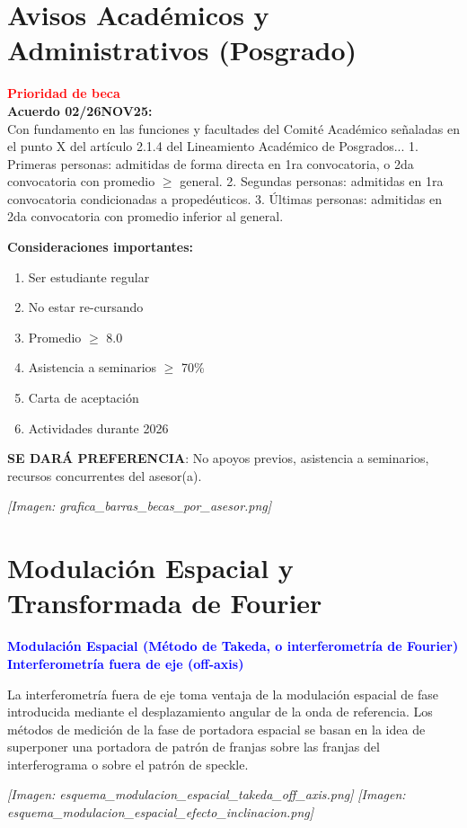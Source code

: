 \documentclass[12pt]{article}
\begin{document}
	\section{Avisos Académicos y Administrativos (Posgrado)}
	\colorbox{gray!20}{\parbox{\textwidth}{
			\textcolor{red}{\textbf{Prioridad de beca}} \\
			\textbf{Acuerdo 02/26NOV25:} \\
			Con fundamento en las funciones y facultades del Comité Académico señaladas en el punto X del artículo 2.1.4 del Lineamiento Académico de Posgrados...
			1. Primeras personas: admitidas de forma directa en 1ra convocatoria, o 2da convocatoria con promedio $\ge$ general.
			2. Segundas personas: admitidas en 1ra convocatoria condicionadas a propedéuticos.
			3. Últimas personas: admitidas en 2da convocatoria con promedio inferior al general.
	}}
	
	\begin{minipage}{0.4\textwidth}
		\textbf{Consideraciones importantes:}
		\begin{enumerate}
			\item Ser estudiante regular
			\item No estar re-cursando
			\item Promedio $\ge$ 8.0
			\item Asistencia a seminarios $\ge$ 70\%
			\item Carta de aceptación
			\item Actividades durante 2026
		\end{enumerate}
	\end{minipage}
	\hfill
	\begin{minipage}{0.55\textwidth}
		\colorbox{green!40}{\textbf{SE DARÁ PREFERENCIA}}: No apoyos previos, asistencia a seminarios, recursos concurrentes del asesor(a).
	\end{minipage}
	\textit{[Imagen: grafica\_barras\_becas\_por\_asesor.png]}
	
	\section{Modulación Espacial y Transformada de Fourier}
	\colorbox{gray!10}{\parbox{\textwidth}{
			\textcolor{blue}{\textbf{Modulación Espacial (Método de Takeda, o interferometría de Fourier) Interferometría fuera de eje (off-axis)}}
			
			La interferometría fuera de eje toma ventaja de la modulación espacial de fase introducida mediante el desplazamiento angular de la onda de referencia. Los métodos de medición de la fase de portadora espacial se basan en la idea de superponer una portadora de patrón de franjas sobre las franjas del interferograma o sobre el patrón de speckle.
	}}
	\textit{[Imagen: esquema\_modulacion\_espacial\_takeda\_off\_axis.png]}
	\textit{[Imagen: esquema\_modulacion\_espacial\_efecto\_inclinacion.png]}
	
\end{document}
